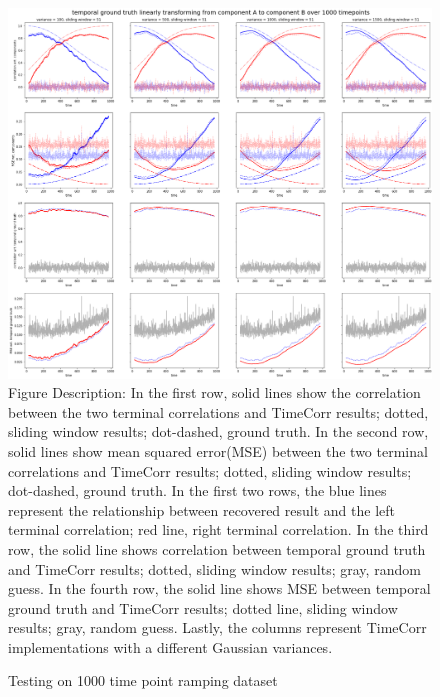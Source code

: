 \documentclass[11pt]{article}
\begin{document}
\begin{figure}[!htb]
\caption{Testing on 1000 time point ramping dataset}
\includegraphics[width=1\textwidth]{../figures/SyntheticTesting/ramp1000t4var.png}
\label{fig:ramp1000t4var}
Figure Description: In the first row, solid lines show the correlation between the two terminal correlations and TimeCorr results; dotted, sliding window results; dot-dashed, ground truth. In the second row, solid lines show mean squared error(MSE) between the two terminal correlations and TimeCorr results; dotted, sliding window results; dot-dashed, ground truth. In the first two rows, the blue lines represent the relationship between recovered result and the left terminal correlation; red line, right terminal correlation. In the third row, the solid line shows correlation between temporal ground truth and TimeCorr results; dotted, sliding window results; gray, random guess. In the fourth row, the solid line shows MSE between temporal ground truth and TimeCorr results; dotted line, sliding window results; gray, random guess. Lastly, the columns represent TimeCorr implementations with a different Gaussian variances.
\end{figure}
\end{document}
